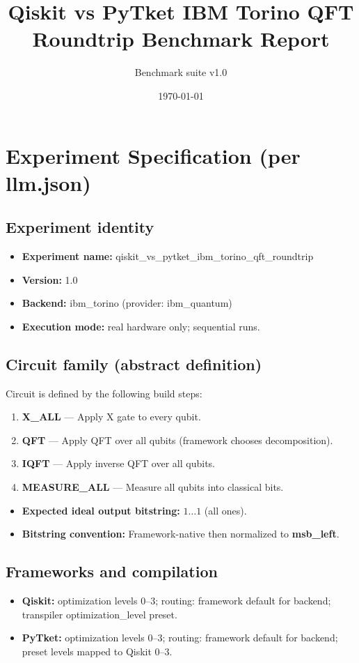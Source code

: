 \documentclass[11pt,a4paper]{article}
\title{Qiskit vs PyTket IBM Torino QFT Roundtrip Benchmark Report}
\author{Benchmark suite v1.0}
\date{\today}
\begin{document}
\maketitle

\section{Experiment Specification (per llm.json)}

\subsection{Experiment identity}
\begin{itemize}
  \item \textbf{Experiment name:} qiskit\_vs\_pytket\_ibm\_torino\_qft\_roundtrip
  \item \textbf{Version:} 1.0
  \item \textbf{Backend:} ibm\_torino (provider: ibm\_quantum)
  \item \textbf{Execution mode:} real hardware only; sequential runs.
\end{itemize}

\subsection{Circuit family (abstract definition)}
Circuit is defined by the following build steps:
\begin{enumerate}
  \item \textbf{X\_ALL} --- Apply X gate to every qubit.
  \item \textbf{QFT} --- Apply QFT over all qubits (framework chooses decomposition).
  \item \textbf{IQFT} --- Apply inverse QFT over all qubits.
  \item \textbf{MEASURE\_ALL} --- Measure all qubits into classical bits.
\end{enumerate}
\begin{itemize}
  \item \textbf{Expected ideal output bitstring:} \(1\ldots 1\) (all ones).
  \item \textbf{Bitstring convention:} Framework-native then normalized to \textbf{msb\_left}.
\end{itemize}

\subsection{Frameworks and compilation}
\begin{itemize}
  \item \textbf{Qiskit:} optimization levels 0--3; routing: framework default for backend; transpiler optimization\_level preset.
  \item \textbf{PyTket:} optimization levels 0--3; routing: framework default for backend; preset levels mapped to Qiskit 0--3.
\end{itemize}
\end{document}
